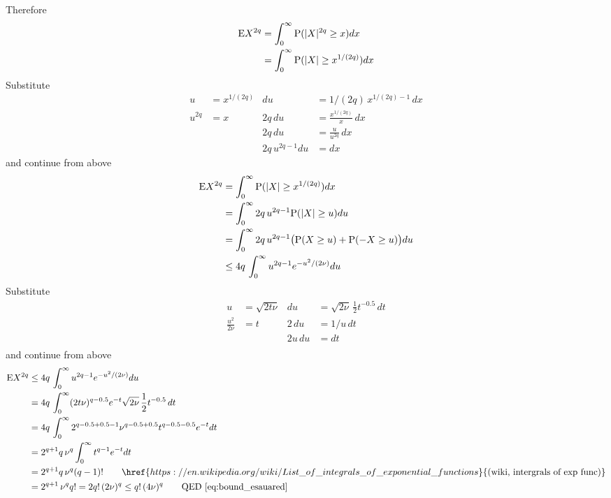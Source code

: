 \begin{prf}
Therefore 
\begin{align*}
\mathrm{E} X^{2q} & = \int_0^\infty \mathrm{P}(|X|^{2q} \ge x) dx \\
& = \int_0^\infty \mathrm{P}(|X| \ge x^{1/(2q)}) dx
\end{align*}
Substitute
\begin{align*}
u & = x^{1/(2q)} & du & = 1/(2q) \, x^{1/(2q)-1} \, dx \\
u^{2q} & = x & 2q \, du & = \frac{x^{1/(2q)}}{x} \, dx \\
 & & 2q \, du & = \frac{u}{u^{2q}} \, dx \\
 & & 2q \, u^{2q-1} du & = dx 
\end{align*}
and continue from above
\begin{align*}
\mathrm{E} X^{2q} 
& = \int_0^\infty \mathrm{P}(|X| \ge x^{1/(2q)}) dx \\
& = \int_0^\infty 2q \, u^{2q-1} \mathrm{P}(|X| \ge u) du \\
& = \int_0^\infty 2q \, u^{2q-1} \big(\mathrm{P}(X \ge u) + \mathrm{P}(-X \ge u)\big) du \\
& \leq 4q \, \int_0^\infty u^{2q-1} e^{- u^2/(2\nu)} du
\end{align*}
Substitute
\begin{align*}
u & = \sqrt{2t\nu} & du & = \sqrt{2\nu}  \, \frac{1}{2} t^{-0.5} \, dt \\
\frac{u^{2}}{2\nu} & = t & 2 \, du & = 1/u \, dt \\
 & & 2u \, du & = dt \\
\end{align*}
and continue from above
\begin{align*}
\rE X^{2q} 
& \leq 4q \, \int_0^\infty u^{2q-1} e^{- u^2/(2\nu)} du \\
& = 4q \, \int_0^\infty (2t\nu)^{q-0.5} e^{-t}\sqrt{2\nu}  \, \frac{1}{2} t^{-0.5} \, dt \\
& = 4q \, \int_0^\infty 2^{q-0.5+0.5-1} \nu^{q-0.5+0.5} t^{q-0.5 -0.5} e^{-t} dt \\
& = 2^{q+1} q \, \nu^{q}  \int_0^\infty t^{q-1} e^{-t} dt \\
& = 2^{q+1} q \, \nu^{q}  (q-1)! \qquad \href{https://en.wikipedia.org/wiki/List\_of\_integrals\_of\_exponential\_functions}{\text{(wiki, intergrals of exp func)}}\\
& = 2^{q+1} \, \nu^{q}  q! = 2 q! \, (2 \nu)^q \leq  q! \, (4 \nu)^q \qquad \text{QED } \eqref{eq:bound_esauared}
\end{align*}


\end{prf}



